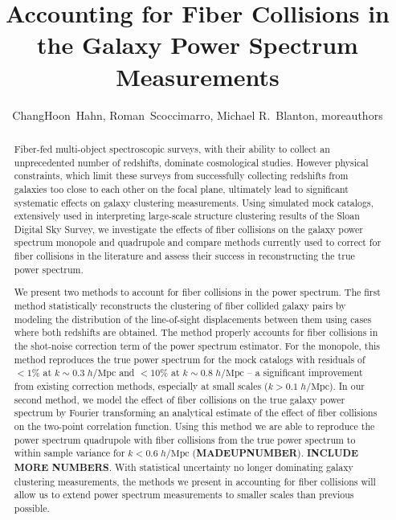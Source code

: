 \documentclass{emulateapj}
\begin{document}
\title{Accounting for Fiber Collisions in the Galaxy Power Spectrum Measurements} 

\author{ChangHoon~Hahn, 
Roman~Scoccimarro, 
Michael R.~Blanton, 
moreauthors} 

\begin{abstract}
Fiber-fed multi-object spectroscopic surveys, with their ability to collect an unprecedented number of redshifts, dominate cosmological studies. However physical constraints, which limit these surveys from successfully collecting redshifts from galaxies too close to each other on the focal plane, ultimately lead to significant systematic effects on galaxy clustering measurements. Using simulated mock catalogs, extensively used in interpreting large-scale structure clustering results of the Sloan Digital Sky Survey, we investigate the effects of fiber collisions on the galaxy power spectrum monopole and quadrupole and compare methods currently used to correct for fiber collisions in the literature and assess their success in reconstructing the true power spectrum. 

We present two methods to account for fiber collisions in the power spectrum. The first method statistically reconstructs the clustering of fiber collided galaxy pairs by modeling the distribution of the line-of-sight displacements between them using cases where both redshifts are obtained. The method properly accounts for fiber collisions in the shot-noise correction term of the power spectrum estimator. For the monopole, this method reproduces the true power spectrum for the mock catalogs with residuals of $< 1\%$ at $k \sim 0.3 \; h/\mathrm{Mpc}$ and $< 10\%$ at $k \sim 0.8 \; h/\mathrm{Mpc}$ -- a significant improvement from existing correction methods, especially at small scales ($k > 0.1\; h/\mathrm{Mpc}$). In our second method, we model the effect of fiber collisions on the true galaxy power spectrum by Fourier transforming an analytical estimate of the effect of fiber collisions on the two-point correlation function. Using this method we are able to reproduce the power spectrum quadrupole with fiber collisions from the true power spectrum to within sample variance for $k < 0.6\;h/\mathrm{Mpc}$ ({\bf MADEUPNUMBER}). {\bf INCLUDE MORE NUMBERS}. With statistical uncertainty no longer dominating galaxy clustering measurements, the methods we present in accounting for fiber collisions will allow us to extend power spectrum measurements to smaller scales than previous possible.


\end{abstract}
\end{document}
